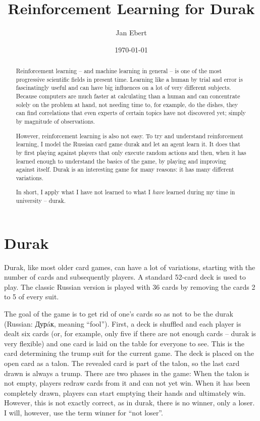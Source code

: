 \documentclass[a4paper,titlepage]{article}
\title{Reinforcement Learning for Durak}
\author{Jan Ebert}
\date{\today}
\begin{document}
\maketitle

\begin{abstract}

Reinforcement learning -- and machine learning in general -- is one of the most progressive scientific fields in present time. Learning like a human by trial and error is fascinatingly useful and can have big influences on a lot of very different subjects. Because computers are much faster at calculating than a human and can concentrate solely on the problem at hand, not needing time to, for example, do the dishes, they can find correlations that even experts of certain topics have not discovered yet; simply by magnitude of observations.

However, reinforcement learning is also not easy. To try and understand reinforcement learning, I model the Russian card game durak and let an agent learn it. It does that by first playing against players that only execute random actions and then, when it has learned enough to understand the basics of the game, by playing and improving against itself.
Durak is an interesting game for many reasons: it has many different variations.

In short, I apply what I have not learned to what I \emph{have} learned during my time in university -- durak.

\end{abstract}

\tableofcontents

\newpage

\section{Durak}

Durak, like most older card games, can have a lot of variations, starting with the number of cards and subsequently players. A standard 52-card deck is used to play. The classic Russian version is played with 36 cards by removing the cards 2 to 5 of every suit.

The goal of the game is to get rid of one's cards so as not to be the durak (Russian: Дурáк, meaning ``fool''). First, a deck is shuffled and each player is dealt six cards (or, for example, only five if there are not enough cards -- durak is very flexible) and one card is laid on the table for everyone to see. This is the card determining the trump suit for the current game. The deck is placed on the open card as a talon. The revealed card is part of the talon, so the last card drawn is always a trump.
There are two phases in the game: When the talon is not empty, players redraw cards from it and can not yet win. When it has been completely drawn, players can start emptying their hands and ultimately win. However, this is not exactly correct, as in durak, there is no winner, only a loser. I will, however, use the term winner for ``not loser''. \medskip
\end{document}
